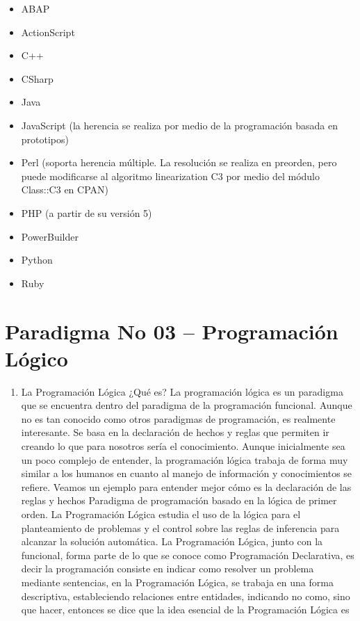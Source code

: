 \begin{enumerate}[1.]
\begin {itemize}
\item ABAP
\item ActionScript
\item C++
\item CSharp
\item Java
\item JavaScript (la herencia se realiza por medio de la programación basada en prototipos)
\item Perl (soporta herencia múltiple. La resolución se realiza en preorden, pero puede modificarse al algoritmo linearization C3 por medio del módulo Class::C3 en CPAN)
\item PHP (a partir de su versión 5)
\item PowerBuilder
\item Python
\item Ruby
\end{itemize}









\end{enumerate}



\section{Paradigma No 03 – Programación Lógico} 

\begin{enumerate}[1.]
	\item La Programación Lógica  
¿Qué es?
La programación lógica es un paradigma que se encuentra dentro del paradigma de la programación funcional. Aunque no es tan conocido como otros paradigmas de programación, es realmente interesante. Se basa en la declaración de hechos y reglas que permiten ir creando lo que para nosotros sería el conocimiento. Aunque inicialmente sea un poco complejo de entender, la programación lógica trabaja de forma muy similar a los humanos en cuanto al manejo de información y conocimientos se refiere. Veamos un ejemplo para entender mejor cómo es la declaración de las reglas y hechos
Paradigma de programación basado en la lógica de primer orden. La Programación Lógica estudia el uso de la lógica para el planteamiento de problemas y el control sobre las reglas de inferencia para alcanzar la solución automática.
La Programación Lógica, junto con la funcional, forma parte de lo que se conoce como Programación Declarativa, es decir la programación consiste en indicar como resolver un problema mediante sentencias, en la Programación Lógica, se trabaja en una forma descriptiva, estableciendo relaciones entre entidades, indicando no como, sino que hacer, entonces se dice que la idea esencial de la Programación Lógica es

	

\end{enumerate}


